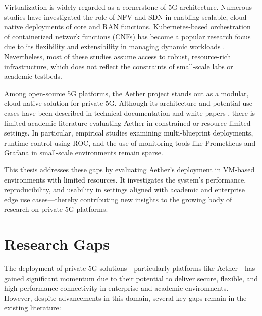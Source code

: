 Virtualization is widely regarded as a cornerstone of 5G architecture. Numerous studies have investigated the role of NFV and SDN in enabling scalable, cloud-native deployments of core and RAN functions. Kubernetes-based orchestration of containerized network functions (CNFs) has become a popular research focus due to its flexibility and extensibility in managing dynamic workloads \cite{5g_kubernetes_cnfs,etsi_nfv}. Nevertheless, most of these studies assume access to robust, resource-rich infrastructure, which does not reflect the constraints of small-scale labs or academic testbeds.

Among open-source 5G platforms, the Aether project stands out as a modular, cloud-native solution for private 5G. Although its architecture and potential use cases have been described in technical documentation and white papers \cite{aether_overview,sdcore_whitepaper}, there is limited academic literature evaluating Aether in constrained or resource-limited settings. In particular, empirical studies examining multi-blueprint deployments, runtime control using ROC, and the use of monitoring tools like Prometheus and Grafana in small-scale environments remain sparse.

This thesis addresses these gaps by evaluating Aether’s deployment in VM-based environments with limited resources. It investigates the system’s performance, reproducibility, and usability in settings aligned with academic and enterprise edge use cases—thereby contributing new insights to the growing body of research on private 5G platforms.



\section{Research Gaps}

The deployment of private 5G solutions—particularly platforms like Aether—has gained significant momentum due to their potential to deliver secure, flexible, and high-performance connectivity in enterprise and academic environments. However, despite advancements in this domain, several key gaps remain in the existing literature:

